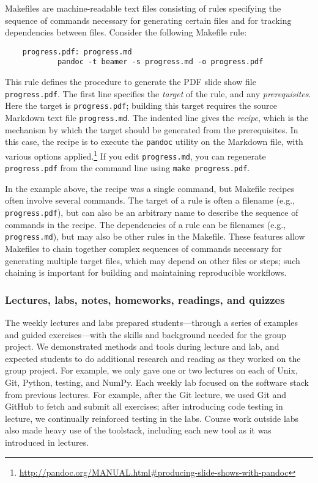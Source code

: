 Makefiles are machine-readable text files consisting of rules
specifying the sequence of commands necessary for generating
certain files and for tracking dependencies between files.
Consider the following Makefile rule:
\begin{verbatim}
    progress.pdf: progress.md
            pandoc -t beamer -s progress.md -o progress.pdf
\end{verbatim}
This rule defines the procedure to generate the PDF slide show file
\texttt{progress.pdf}. The first line specifies the \textit{target} of the
rule, and any \textit{prerequisites}.  Here the target is
\texttt{progress.pdf}; building this target requires the source
Markdown text file \texttt{progress.md}. The indented line gives the
\textit{recipe}, which is the mechanism by which the target
should be generated from the prerequisites.  In this case, the recipe is to
execute the \texttt{pandoc} utility on the Markdown file, with various options
applied.\footnote{\url{http://pandoc.org/MANUAL.html\#producing-slide-shows-with-pandoc}}
If you edit \texttt{progress.md}, you can regenerate \texttt{progress.pdf}
from the command line using \texttt{make progress.pdf}.

In the example above, the recipe was a single command, but Makefile recipes
often involve several commands.  The target of a rule is often a filename
(e.g., \texttt{progress.pdf}), but can also be an arbitrary name to describe
the sequence of commands in the recipe.  The dependencies of a rule can be
filenames (e.g., \texttt{progress.md}), but may also be other rules in the
Makefile.  These features allow Makefiles to chain together complex sequences
of commands necessary for generating multiple target files, which may depend on
other files or steps; such chaining is important for building and maintaining
reproducible workflows.

\subsubsection{Lectures, labs, notes, homeworks, readings, and quizzes}

The weekly lectures and labs prepared students---through a
series of examples and guided exercises---with the skills and
background needed for the group project.
We demonstrated methods and tools during lecture and lab,
and expected students to do additional research and reading as they worked on
the group project.
For example, we only gave one or two lectures on each of Unix, Git, Python,
testing, and NumPy.
Each weekly lab focused on the software stack from previous lectures.
For example, after the Git lecture, we used Git and GitHub to fetch and submit
all exercises;
after introducing code testing in lecture, we continually reinforced testing in
the labs.
Course work outside labs also made heavy use of the toolstack, including each
new tool as it was introduced in lectures.

